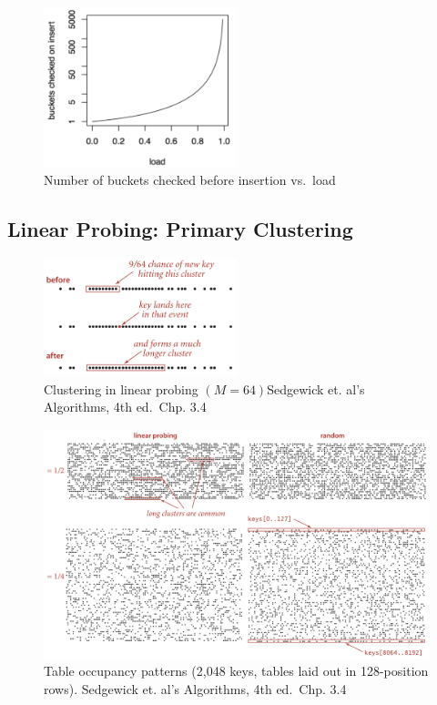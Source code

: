 \documentclass[
  10pt,
  english,
  letterpaper,
,tablecaptionabove
]{scrartcl}
\begin{document}
\begin{figure}
\centering
\includegraphics[width=0.5\textwidth,height=\textheight]{images/2.png}
\caption{Number of buckets checked before insertion vs.~load}
\end{figure}

\hypertarget{linear-probing-primary-clustering}{%
\subsection{Linear Probing: Primary
Clustering}\label{linear-probing-primary-clustering}}

\begin{figure}
\centering
\includegraphics[width=0.5\textwidth,height=\textheight]{images/3.png}
\caption{Clustering in linear probing \((M = 64)\)Sedgewick et. al's
Algorithms, 4th ed.~Chp. 3.4}
\end{figure}

\begin{figure}
\centering
\includegraphics[width=1\textwidth,height=\textheight]{images/4.png}
\caption{Table occupancy patterns (2,048 keys, tables laid out in
128-position rows). Sedgewick et. al's Algorithms, 4th ed.~Chp. 3.4}
\end{figure}
\end{document}
